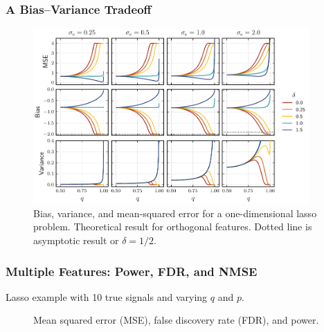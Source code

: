 \documentclass[10pt]{beamer}
\begin{document}
\begin{frame}[c]
  \frametitle{A Bias--Variance Tradeoff}

  \begin{figure}
    \centering
    \includegraphics[width=0.94\textwidth]{figures/paper6-bias-var-onedim.pdf}
    \caption{%
      Bias, variance, and mean-squared error for a one-dimensional lasso problem. Theoretical result for orthogonal features. Dotted line is asymptotic result or \(\delta = 1/2\).
    }
  \end{figure}

\end{frame}

\begin{frame}[c]
  \frametitle{Multiple Features: Power, FDR, and NMSE}

  Lasso example with 10 true signals and varying \(q\) and \(p\).

  \begin{figure}[htpb]
    \centering
    \hfill\pause%
    \caption{%
      Mean squared error (MSE), false discovery rate (FDR), and power.
    }
  \end{figure}
\end{frame}
\end{document}
